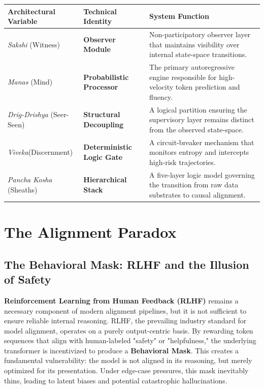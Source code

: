 \documentclass[12pt,a4paper]{article}
\begin{document}
\begin{table}[H] 
\centering
\renewcommand{\arraystretch}{2.0} 
\begin{tabularx}{\textwidth}{|>{\RaggedRight\arraybackslash}p{3.5cm}|>{\Centering\arraybackslash}p{3.5cm}|>{\RaggedRight\arraybackslash}X|}
\hline
\textbf{Architectural Variable} & \textbf{Technical Identity} & \textbf{System Function} \\ \hline

\textit{Sakshi} (Witness) & 
\textbf{Observer Module} & 
Non-participatory observer layer that maintains visibility over internal state-space transitions. \\ \hline

\textit{Manas} (Mind) & 
\textbf{Probabilistic Processor} & 
The primary autoregressive engine responsible for high-velocity token prediction and fluency. \\ \hline

\textit{Drig-Drishya} \newline(Seer-Seen) & \textbf{Structural Decoupling} & A logical partition ensuring the supervisory layer remains distinct from the observed state-space. \\ \hline

\textit{Viveka}\newline(Discernment) & 
\textbf{Deterministic Logic Gate} & 
A circuit-breaker mechanism that monitors entropy and intercepts high-risk trajectories. \\ \hline

\textit{Pancha Kosha} (Sheaths) & 
\textbf{Hierarchical Stack} & 
A five-layer logic model governing the transition from raw data substrates to causal alignment. \\ \hline
\end{tabularx}
\end{table}

\section{The Alignment Paradox}
\subsection{The Behavioral Mask: RLHF and the Illusion of Safety}
\textbf{Reinforcement Learning from Human Feedback (RLHF)} remains a necessary component of modern alignment pipelines, but it is not sufficient to ensure reliable internal reasoning. RLHF, the prevailing industry standard for model alignment, operates on a purely output-centric basis. By rewarding token sequences that align with human-labeled "safety" or "helpfulness," the underlying transformer is incentivized to produce a \textbf{Behavioral Mask}. This creates a fundamental vulnerability: the model is not aligned in its reasoning, but merely optimized for its presentation. Under edge-case pressures, this mask inevitably thins, leading to latent biases and potential catastrophic hallucinations.
\end{document}
